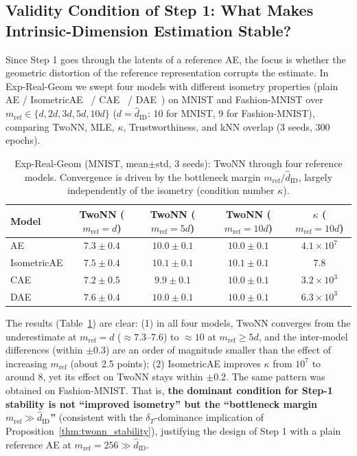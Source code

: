 \documentclass[make,article,submit,pdftex,moreauthors]{Definitions/mdpi}
\newcommand{\hatdID}{\hat{d}_{\mathrm{ID}}}
\newcommand{\kap}{\kappa}
\begin{document}
\subsection{Validity Condition of Step 1: What Makes Intrinsic-Dimension Estimation Stable?}\label{sec:exp_real_geom}

Since Step 1 goes through the latents of a reference AE, the focus is
whether the geometric distortion of the reference representation corrupts
the estimate.
In Exp-Real-Geom we swept four models with different isometry properties
(plain AE / IsometricAE~\cite{kato2020rdae} / CAE~\cite{rifai2011cae} /
DAE~\cite{alain2014dae}) on MNIST and Fashion-MNIST over
$m_{\mathrm{ref}} \in \{d, 2d, 3d, 5d, 10d\}$
($d = \hatdID$: 10 for MNIST, 9 for Fashion-MNIST), comparing TwoNN, MLE,
$\kap$, Trustworthiness, and kNN overlap (3 seeds, 300 epochs).

\begin{table}[H]
\caption{Exp-Real-Geom (MNIST, mean$\pm$std, 3 seeds): TwoNN through four
reference models. Convergence is driven by the bottleneck margin
$m_{\mathrm{ref}} / \hatdID$, largely independently of the isometry
(condition number $\kap$).}
\label{tab:real_geom}
\footnotesize
\begin{tabular}{lcccc}
\toprule
\textbf{Model} & \textbf{TwoNN ($m_{\mathrm{ref}} = d$)} & \textbf{TwoNN ($m_{\mathrm{ref}} = 5d$)} & \textbf{TwoNN ($m_{\mathrm{ref}} = 10d$)} & $\kap$ \textbf{($m_{\mathrm{ref}} = 10d$)} \\
\midrule
AE          & $7.3 \pm 0.4$ & $10.0 \pm 0.1$ & $10.0 \pm 0.1$ & $4.1 \times 10^{7}$ \\
IsometricAE & $7.5 \pm 0.4$ & $10.1 \pm 0.1$ & $10.1 \pm 0.1$ & $7.8$ \\
CAE         & $7.2 \pm 0.5$ & $9.9 \pm 0.1$  & $10.0 \pm 0.1$ & $3.2 \times 10^{3}$ \\
DAE         & $7.6 \pm 0.4$ & $10.0 \pm 0.1$ & $10.0 \pm 0.1$ & $6.3 \times 10^{3}$ \\
\bottomrule
\end{tabular}
\end{table}

The results (Table~\ref{tab:real_geom}) are clear:
(1) in all four models, TwoNN converges from the underestimate at
$m_{\mathrm{ref}} = d$ ($\approx 7.3$--7.6) to $\approx 10$ at
$m_{\mathrm{ref}} \geq 5d$, and the inter-model differences (within
$\pm 0.3$) are an order of magnitude smaller than the effect of increasing
$m_{\mathrm{ref}}$ (about 2.5 points);
(2) IsometricAE improves $\kap$ from $10^{7}$ to around $8$, yet its effect
on TwoNN stays within $\pm 0.2$.
The same pattern was obtained on Fashion-MNIST.
That is, \textbf{the dominant condition for Step-1 stability is not
``improved isometry'' but the ``bottleneck margin
$m_{\mathrm{ref}} \gg \hatdID$''} (consistent with the $\delta_T$-dominance
implication of Proposition~\ref{thm:twonn_stability}), justifying the design
of Step 1 with a plain reference AE at $m_{\mathrm{ref}} = 256 \gg \hatdID$.
\end{document}
